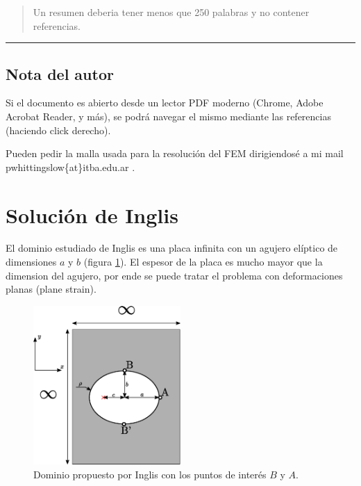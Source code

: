 \documentclass[titlepage,11pt]{article}
\begin{document}
    

\begin{abstract}
Un resumen deberia tener menos que 250 palabras y no contener referencias.

\end{abstract}

\newpage
\tableofcontents
\newpage
\printunsrtglossaries %

\vfill
\hrule
\vspace{-1cm}
\subsection*{Nota del autor}
Si el documento es abierto desde un lector PDF moderno (Chrome, Adobe Acrobat Reader, y más), se podrá navegar el mismo mediante las referencias (haciendo click derecho).

Pueden pedir la malla usada para la resolución del FEM dirigiendosé a mi mail pwhittingslow\{at\}itba.edu.ar .
\newpage


\section{Solución de Inglis}
El dominio estudiado de Inglis \cite{inglis1913} es una placa infinita con un agujero elíptico de dimensiones $a$ y $b$ (figura \ref{fig:dom}). El espesor de la placa es mucho mayor que la dimension del agujero, por ende se puede tratar el problema con deformaciones planas (plane strain). 


\begin{figure}[htb!]
	\centering
	\includegraphics[width=0.5\textwidth]{fig/domain_diagram.eps}
	\caption{Dominio propuesto por Inglis con los puntos de interés $B$ y $A$.}
	\label{fig:dom}
\end{figure}
\end{document}
